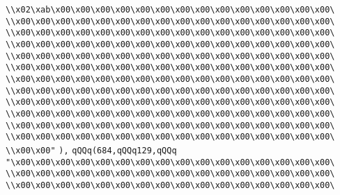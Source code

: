 \verb|\\x02\xab\x00\x00\x00\x00\x00\x00\x00\x00\x00\x00\x00\x00\x00\x00\|\newline
\verb|\\x00\x00\x00\x00\x00\x00\x00\x00\x00\x00\x00\x00\x00\x00\x00\x00\|\newline
\verb|\\x00\x00\x00\x00\x00\x00\x00\x00\x00\x00\x00\x00\x00\x00\x00\x00\|\newline
\verb|\\x00\x00\x00\x00\x00\x00\x00\x00\x00\x00\x00\x00\x00\x00\x00\x00\|\newline
\verb|\\x00\x00\x00\x00\x00\x00\x00\x00\x00\x00\x00\x00\x00\x00\x00\x00\|\newline
\verb|\\x00\x00\x00\x00\x00\x00\x00\x00\x00\x00\x00\x00\x00\x00\x00\x00\|\newline
\verb|\\x00\x00\x00\x00\x00\x00\x00\x00\x00\x00\x00\x00\x00\x00\x00\x00\|\newline
\verb|\\x00\x00\x00\x00\x00\x00\x00\x00\x00\x00\x00\x00\x00\x00\x00\x00\|\newline
\verb|\\x00\x00\x00\x00\x00\x00\x00\x00\x00\x00\x00\x00\x00\x00\x00\x00\|\newline
\verb|\\x00\x00\x00\x00\x00\x00\x00\x00\x00\x00\x00\x00\x00\x00\x00\x00\|\newline
\verb|\\x00\x00\x00\x00\x00\x00\x00\x00\x00\x00\x00\x00\x00\x00\x00\x00\|\newline
\verb|\\x00\x00\x00\x00\x00\x00\x00\x00\x00\x00\x00\x00\x00\x00\x00\x00\|\newline
\verb|\\x00\x00"|\newline
\verb|),|\newline
\verb|qQQq(684,qQQq129,qQQq|\newline
\verb|"\x00\x00\x00\x00\x00\x00\x00\x00\x00\x00\x00\x00\x00\x00\x00\x00\|\newline
\verb|\\x00\x00\x00\x00\x00\x00\x00\x00\x00\x00\x00\x00\x00\x00\x00\x00\|\newline
\verb|\\x00\x00\x00\x00\x00\x00\x00\x00\x00\x00\x00\x00\x00\x00\x00\x00\|\newline
